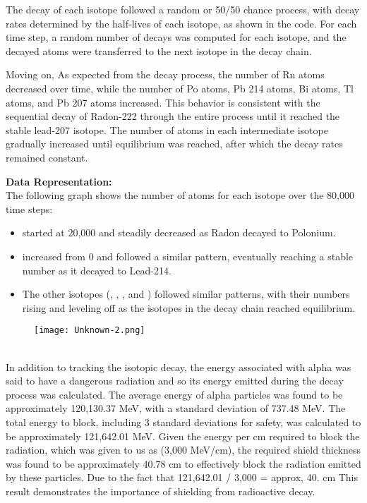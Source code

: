 \documentclass[12pt]{article}
\begin{document}
The decay of each isotope followed a random or 50/50 chance process, with decay rates determined by the half-lives of each isotope, as shown in the code. For each time step, a random number of decays was computed for each isotope, and the decayed atoms were transferred to the next isotope in the decay chain.


Moving on, As expected from the decay process, the number of Rn atoms decreased over time, while the number of Po atoms, Pb 214 atoms, Bi atoms, Tl atoms, and Pb 207 atoms increased. This behavior is consistent with the sequential decay of Radon-222 through the entire process until it reached the stable lead-207 isotope. The number of atoms in each intermediate isotope gradually increased until equilibrium was reached, after which the decay rates remained constant.

\vspace{1cm}
\textbf{Data Representation:}\\

The following graph shows the number of atoms for each isotope over the 80,000 time steps:

\begin{itemize}
    \item {} started at 20,000 and steadily decreased as Radon decayed to Polonium.
    \item {} increased from 0 and followed a similar pattern, eventually reaching a stable number as it decayed to Lead-214.
    \item The other isotopes (, , , and ) followed similar patterns, with their numbers rising and leveling off as the isotopes in the decay chain reached equilibrium.
\end{itemize}
\begin{figure}[ht]
    \centering
    \texttt{[image: Unknown-2.png]}
    \label{fig:decay_curve}
\end{figure}
\vspace{2cm}
\\

In addition to tracking the isotopic decay, the energy associated with alpha was said to have a dangerous radiation and so its energy emitted during the decay process was calculated. The average energy of alpha particles was found to be approximately 120,130.37 MeV, with a standard deviation of 737.48 MeV. The total energy to block, including 3 standard deviations for safety, was calculated to be approximately 121,642.01 MeV. Given the energy per cm required to block the radiation, which was given to us as (3,000 MeV/cm), the required shield thickness was found to be approximately 40.78 cm to effectively block the radiation emitted by these particles. Due to the fact that 121,642.01 / 3,000 = approx, 40. cm
This result demonstrates the importance of shielding from radioactive decay. 
\end{document}
